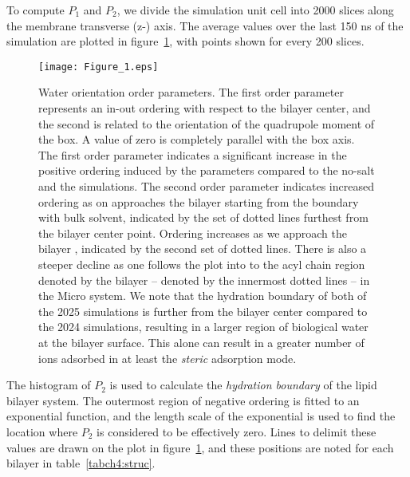 To compute $P_1$ and $P_2$, we divide the simulation unit cell into 2000 slices along the membrane transverse (z-) axis.  
The average values over the last 150 ns of the simulation are plotted in figure~\ref{figch4:h2order}, with points shown for every 200 slices. 

\begin{figure}[H]
    \caption[Water orientational order parameters]{Water orientation order parameters. The first
    order parameter represents an in-out ordering with respect to the bilayer center, and the second is related to the orientation of the quadrupole moment of the box. A value of zero is completely
    parallel with the box axis.  
    The first order parameter indicates a significant increase in the positive ordering induced by the  parameters compared to the no-salt and the
         simulations.  The second order parameter indicates increased ordering as on approaches the bilayer starting from the boundary with bulk solvent, indicated by the set of dotted lines
        furthest from the bilayer center point. Ordering increases as we approach the bilayer \dhh{}, indicated by the second set of dotted lines. There is also a steeper decline as one follows the plot into to the acyl chain region denoted by the bilayer \dc{} -- denoted by the innermost dotted lines --  in the
 Micro system. We note that the hydration boundary of both of the 2025 simulations is further from the bilayer center compared to the 2024 simulations, resulting in a larger region of biological water
at the bilayer surface. This alone can result in a greater number of ions adsorbed in at least the \emph{steric} adsorption mode.} 
    \label{figch4:h2order}
    \texttt{[image: Figure\_1.eps]}
\end{figure}
The histogram of $P_2$ is used to calculate the \emph{hydration boundary} of the lipid bilayer system. The outermost
region of negative ordering is fitted to an exponential function, and the length scale of the exponential is used to find the location where $P_2$ is considered to be effectively zero. 
Lines to delimit these values are drawn on the plot in figure~\ref{figch4:h2order}, and these positions are noted for each bilayer
in table~\ref{tabch4:struc}.
